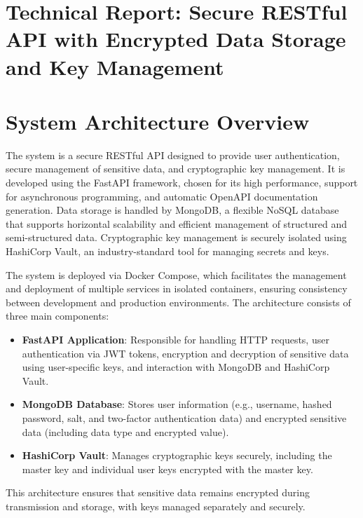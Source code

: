 \documentclass[a4paper,12pt]{article}
\begin{document}
\onehalfspacing

\section*{Technical Report: Secure RESTful API with Encrypted Data Storage and Key Management}

\section{System Architecture Overview}
The system is a secure RESTful API designed to provide user authentication, secure management of sensitive data, and cryptographic key management. It is developed using the FastAPI framework, chosen for its high performance, support for asynchronous programming, and automatic OpenAPI documentation generation. Data storage is handled by MongoDB, a flexible NoSQL database that supports horizontal scalability and efficient management of structured and semi-structured data. Cryptographic key management is securely isolated using HashiCorp Vault, an industry-standard tool for managing secrets and keys.

The system is deployed via Docker Compose, which facilitates the management and deployment of multiple services in isolated containers, ensuring consistency between development and production environments. The architecture consists of three main components:
\begin{itemize}
    \item \textbf{FastAPI Application}: Responsible for handling HTTP requests, user authentication via JWT tokens, encryption and decryption of sensitive data using user-specific keys, and interaction with MongoDB and HashiCorp Vault.
    \item \textbf{MongoDB Database}: Stores user information (e.g., username, hashed password, salt, and two-factor authentication data) and encrypted sensitive data (including data type and encrypted value).
    \item \textbf{HashiCorp Vault}: Manages cryptographic keys securely, including the master key and individual user keys encrypted with the master key.
\end{itemize}
This architecture ensures that sensitive data remains encrypted during transmission and storage, with keys managed separately and securely.

\end{document}

